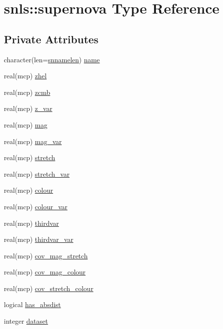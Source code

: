 \hypertarget{structsnls_1_1supernova}{}\section{snls\+:\+:supernova Type Reference}
\label{structsnls_1_1supernova}
\subsection*{Private Attributes}
\begin{DoxyCompactItemize}
\item 
character(len=\mbox{\hyperlink{namespacesnls_a0985d8ccb89aafea09ab6de4c78c5600}{snnamelen}}) \mbox{\hyperlink{structsnls_1_1supernova_a2078d9138997daa7f828fdd7eb31390f}{name}}
\item 
real(mcp) \mbox{\hyperlink{structsnls_1_1supernova_a3006274804a1b8a3227b6038800c97b9}{zhel}}
\item 
real(mcp) \mbox{\hyperlink{structsnls_1_1supernova_ae718c87952c492cb3bd8f80a79cc1f26}{zcmb}}
\item 
real(mcp) \mbox{\hyperlink{structsnls_1_1supernova_a7a01842ee3252293e38723e4d541ae8f}{z\+\_\+var}}
\item 
real(mcp) \mbox{\hyperlink{structsnls_1_1supernova_a6f84054e5c434f2e943a8866c9fae45e}{mag}}
\item 
real(mcp) \mbox{\hyperlink{structsnls_1_1supernova_a36476fe15dadb87d608bfdf5f773ebf1}{mag\+\_\+var}}
\item 
real(mcp) \mbox{\hyperlink{structsnls_1_1supernova_ad6dc4c2d8ee553ec8a41b3bc3f38a506}{stretch}}
\item 
real(mcp) \mbox{\hyperlink{structsnls_1_1supernova_acfd5c6bd67702689b2f2aa512463ca74}{stretch\+\_\+var}}
\item 
real(mcp) \mbox{\hyperlink{structsnls_1_1supernova_a5349331bcb4b2bfb5cb991814f35a061}{colour}}
\item 
real(mcp) \mbox{\hyperlink{structsnls_1_1supernova_a76dc1f66fc04d1bd2209600c78122db2}{colour\+\_\+var}}
\item 
real(mcp) \mbox{\hyperlink{structsnls_1_1supernova_a26d3ec5056f4ad60064dc8aee750999c}{thirdvar}}
\item 
real(mcp) \mbox{\hyperlink{structsnls_1_1supernova_ac1140927a85de5179ff11a066b7070a6}{thirdvar\+\_\+var}}
\item 
real(mcp) \mbox{\hyperlink{structsnls_1_1supernova_a69e5baa74d2221ef207060d00121c047}{cov\+\_\+mag\+\_\+stretch}}
\item 
real(mcp) \mbox{\hyperlink{structsnls_1_1supernova_aca478ec3c10992793f6f95cbfd35173d}{cov\+\_\+mag\+\_\+colour}}
\item 
real(mcp) \mbox{\hyperlink{structsnls_1_1supernova_a76cc35b84e3b3d221f1d4316253c86b1}{cov\+\_\+stretch\+\_\+colour}}
\item 
logical \mbox{\hyperlink{structsnls_1_1supernova_ab49366fec41efd579876cb72b08eb7e1}{has\+\_\+absdist}}
\item 
integer \mbox{\hyperlink{structsnls_1_1supernova_a21642193e3ac9d49d8c98e971c0181b6}{dataset}}
\end{DoxyCompactItemize}



